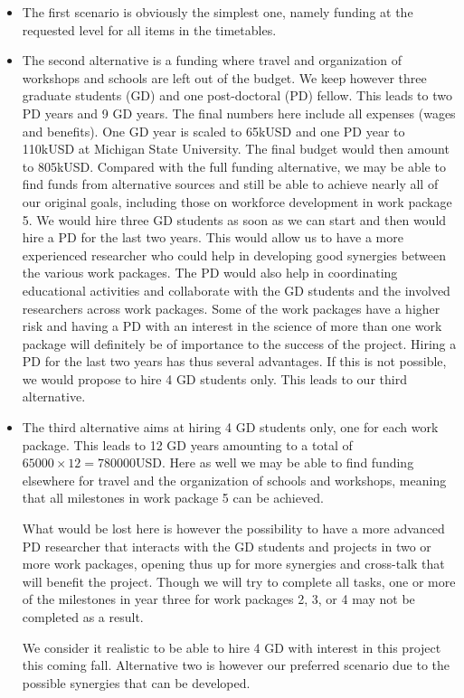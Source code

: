 \documentclass[11pt]{article}
\begin{document}
\begin{itemize}
    \item The first scenario is obviously the simplest one, namely funding at the requested level for all items in the timetables.
    \item The second alternative is a funding where travel and organization of workshops and schools are left out of the budget. We keep however three graduate students (GD) and one post-doctoral (PD) fellow. This leads to two PD years and 9 GD years. The final numbers here include all expenses (wages and benefits). One GD year is scaled to 65kUSD and one PD year to 110kUSD at Michigan State University. The final budget would then amount to 805kUSD. Compared with the full funding alternative, we may be able to find funds from alternative sources and still be able to achieve nearly all of our original goals, including those on workforce development in work package 5. We would hire three GD students as soon as we can start and then would hire a PD for the last two years. This would allow us to have a more experienced researcher who could help in developing good synergies between the various work packages. The PD would also help in coordinating educational activities and collaborate with the GD students and the involved researchers across work packages.   Some of the work packages have a higher risk and having a PD with an interest in the science of more than one work package will definitely be of importance to the success of the project.  Hiring a PD for the last two years has thus several advantages. If this is not possible, we would propose to hire 4 GD students only. This leads  to our third alternative.
    \item The third alternative aims at hiring 4 GD students only, one for each work package. This leads to 12 GD years amounting to a total of $65000\times 12=780000$USD. Here as well we may be able to find funding elsewhere for travel and the organization of schools and workshops, meaning that all milestones in work package 5 can be achieved. 
    
    What would be lost here is however the possibility to have a more advanced PD researcher that interacts with the GD students and projects in two or more work packages, opening thus up for more synergies and cross-talk that will benefit the project.  Though we will try to complete all tasks, one or more of the milestones in year three for work packages 2, 3, or 4 may not be completed as a result.
    
    We consider it realistic to be able to hire 4 GD with interest in this project this coming fall. Alternative two is however our preferred scenario due to the possible synergies that can be developed. 
    
\end{itemize}
\end{document}
